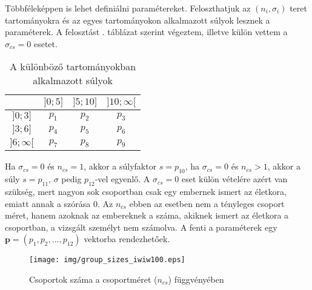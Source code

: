 \documentclass[12pt]{article}
\begin{document}
Többféleképpen is lehet definiálni paramétereket. Feloszthatjuk az $(n_i, \sigma_i)$ teret \iffalse TODO: vagy mit \fi tartományokra és az egyes tartományokon alkalmazott súlyok lesznek a paraméterek. A felosztást . táblázat szerint végeztem, illetve külön vettem a $\sigma_{cs} = 0$ esetet. %
\begin{table}[H]
	\centering
	\begin{tabular}{|c|c|c|c|}
		\hline
		\diagbox{$\sigma_{cs}$}{$n_{cs}$} & $]0;5]$ & $]5;10]$ & $]10;\infty[$  \\
		\hline
		$]0;3]$ & $p_1$ & $p_2$ & $p_3$ \\
		\hline
		$]3;6]$ & $p_4$ & $p_5$ & $p_6$ \\
		\hline
		$]6;\infty[$  & $p_7$ & $p_8$ & $p_9$ \\
		\hline
	\end{tabular}
	\caption{A különböző tartományokban alkalmazott súlyok}
	\label{felosztas}
\end{table}
\noindent
Ha $\sigma_{cs} = 0$ és $n_{cs} = 1$, akkor a súlyfaktor $s = p_{10}$, ha $\sigma_{cs} = 0$ és $n_{cs} > 1$, akkor a súly $s = p_{11}$, $\sigma$ pedig $p_{12}$-vel egyenlő. A $\sigma_{cs} = 0$ eset külön vételére azért van szükség, mert nagyon sok csoportban csak egy embernek ismert az életkora, emiatt annak a szórása $0$. Az $n_{cs}$ ebben az esetben nem a tényleges csoport méret, hanem azoknak az embereknek a száma, akiknek ismert az életkora a csoportban, a vizsgált személyt nem számolva.
A fenti a paraméterek egy $\mathbf{p} = (p_1, p_2, ..., p_{12})$ vektorba rendezhetőek.

\begin{figure}[H]
	\centering
	\texttt{[image: img/group\_sizes\_iwiw100.eps]}
	\caption{Csoportok száma a csoportméret ($n_{cs}$) függvényében}
\end{figure}
\end{document}
